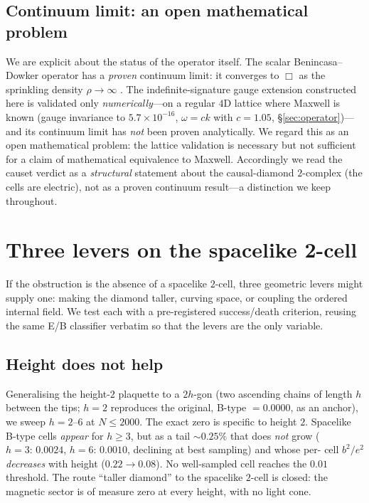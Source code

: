 \documentclass[aps,prd,reprint,nofootinbib,superscriptaddress,floatfix]{revtex4-2}
\begin{document}
\subsection{Continuum limit: an open mathematical problem}\label{sec:contlimit}
We are explicit about the status of the operator itself. The scalar Benincasa--Dowker
operator has a \emph{proven} continuum limit: it converges to $\Box$ as the sprinkling
density $\rho\to\infty$
\cite{BenincasaDowker2010,DowkerGlaser2013,BelenchiaBenincasaDowker2016}. The
indefinite-signature gauge extension constructed here is validated only
\emph{numerically}---on a regular $4$D lattice where Maxwell is known (gauge invariance
to $5.7\times10^{-16}$, $\omega=ck$ with $c=1.05$, \S\ref{sec:operator})---and its
continuum limit has \emph{not} been proven analytically. We regard this as an open
mathematical problem: the lattice validation is necessary but not sufficient for a
claim of mathematical equivalence to Maxwell. Accordingly we read the causet verdict as
a \emph{structural} statement about the causal-diamond $2$-complex (the cells are
electric), not as a proven continuum result---a distinction we keep throughout.

\section{Three levers on the spacelike 2-cell}\label{sec:levers}

If the obstruction is the absence of a spacelike $2$-cell, three geometric levers might
supply one: making the diamond taller, curving space, or coupling the ordered internal
field. We test each with a pre-registered success/death criterion, reusing the same
E/B classifier verbatim so that the levers are the only variable.

\subsection{Height does not help}\label{sec:height}
Generalising the height-$2$ plaquette to a $2h$-gon (two ascending chains of length $h$
between the tips; $h=2$ reproduces the original, B-type $=0.0000$, as an anchor), we
sweep $h=2$--$6$ at $N\le2000$. The exact zero is specific to height $2$. Spacelike
B-type cells \emph{appear} for $h\ge3$, but as a tail $\sim0.25\%$ that does \emph{not}
grow ($h{=}3{:}\,0.0024$, $h{=}6{:}\,0.0010$, declining at best sampling) and whose per-
cell $b^2/e^2$ \emph{decreases} with height ($0.22\to0.08$). No well-sampled cell reaches
the $0.01$ threshold. The route ``taller diamond'' to the spacelike $2$-cell is closed:
the magnetic sector is of measure zero at every height, with no light cone.
\end{document}
